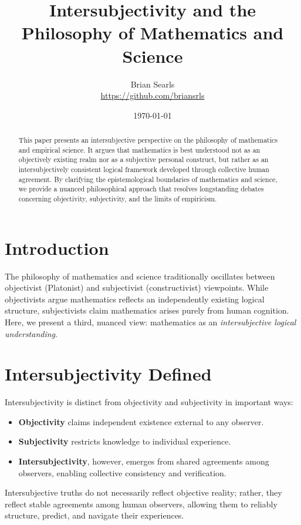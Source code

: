 \documentclass{article}
\title{Intersubjectivity and the Philosophy of Mathematics and Science}
\author{Brian Searls\\\href{https://github.com/briansrls}{https://github.com/briansrls}}
\date{\today}
\begin{document}
\maketitle

\begin{abstract}
This paper presents an intersubjective perspective on the philosophy of mathematics and empirical science. It argues that mathematics is best understood not as an objectively existing realm nor as a subjective personal construct, but rather as an intersubjectively consistent logical framework developed through collective human agreement. By clarifying the epistemological boundaries of mathematics and science, we provide a nuanced philosophical approach that resolves longstanding debates concerning objectivity, subjectivity, and the limits of empiricism.
\end{abstract}

\section{Introduction}

The philosophy of mathematics and science traditionally oscillates between objectivist (Platonist) and subjectivist (constructivist) viewpoints. While objectivists argue mathematics reflects an independently existing logical structure, subjectivists claim mathematics arises purely from human cognition. Here, we present a third, nuanced view: mathematics as an \textit{intersubjective logical understanding}.

\section{Intersubjectivity Defined}

Intersubjectivity is distinct from objectivity and subjectivity in important ways:

\begin{itemize}
    \item \textbf{Objectivity} claims independent existence external to any observer.
    \item \textbf{Subjectivity} restricts knowledge to individual experience.
    \item \textbf{Intersubjectivity}, however, emerges from shared agreements among observers, enabling collective consistency and verification.
\end{itemize}

Intersubjective truths do not necessarily reflect objective reality; rather, they reflect stable agreements among human observers, allowing them to reliably structure, predict, and navigate their experiences.
\end{document}
